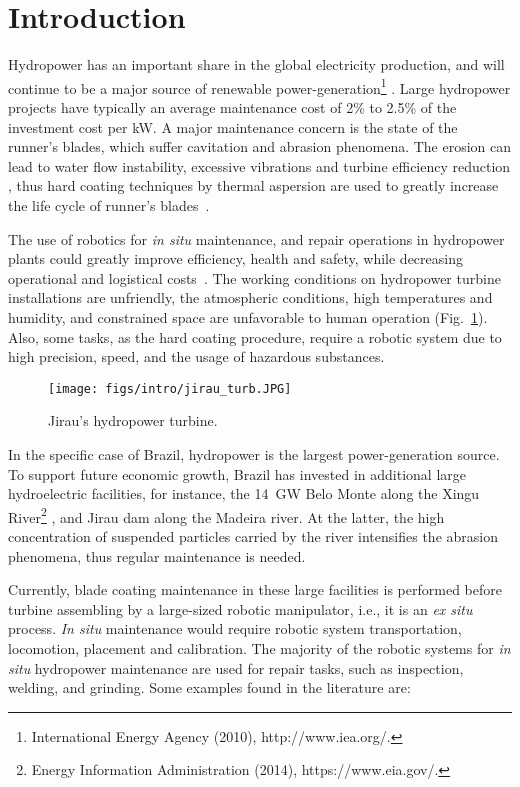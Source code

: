 \section{Introduction}

Hydropower has an important share in the global electricity production, and
will continue to be a major source of renewable power-generation\footnote{International Energy
Agency (2010), http://www.iea.org/.}%
. Large hydropower projects have typically an ave\-rage maintenance cost of 2\%
to 2.5\% of the investment cost per kW. A major maintenance concern
is the state of the runner's blades, which suffer cavitation and abrasion
phenomena. The erosion can lead to water flow instability, excessive vibrations
and turbine efficiency reduction \cite{goldemberg2007energia}, thus hard
coating techniques by thermal aspersion are used to greatly increase the life
cycle of runner's blades~\cite{krella2011new}.

The use of robotics for \textit{in situ} maintenance, and repair operations in
hydropower plants could greatly improve efficiency, health and safety, while
decreasing operational and logistical costs~\cite{hazel2012field}. The working
conditions on hydropower turbine installations are unfriendly, the atmospheric
conditions, high temperatures and humidity, and constrained space are
unfavorable to human operation (Fig.~\ref{fig::jirau_turb}). Also, some tasks,
as the hard coating procedure, require a robotic system due to high precision, speed, and the
usage of hazardous substances.

\begin{figure}[h!]
\centering
	\texttt{[image: figs/intro/jirau\_turb.JPG]} 
	\caption{Jirau's hydropower turbine.}
	\label{fig::jirau_turb}
\end{figure}

In the specific case of Brazil, hydropower is the largest
power-generation source. To support future economic growth, Brazil has
invested in additional large hydroelectric facilities, for instance, the
14~GW Belo Monte along the Xingu River\footnote{Energy
Information Administration (2014), https://www.eia.gov/.}%
, and Jirau dam
along the Madeira river. At the latter, the high concentration of suspended
particles carried by the river intensifies the abrasion phenomena, thus
regular maintenance is needed. 

Currently, blade coating maintenance in these large facilities is performed
before turbine assembling by a large-sized robotic manipulator, i.e., it is an
\textit{ex situ} process. \textit{In situ} maintenance would require robotic
system transportation, locomotion, placement and calibration. The majority of
the robotic systems for \textit{in situ} hydropower maintenance are used for
repair tasks, such as inspection, welding, and grinding. Some examples found in
the literature are:

